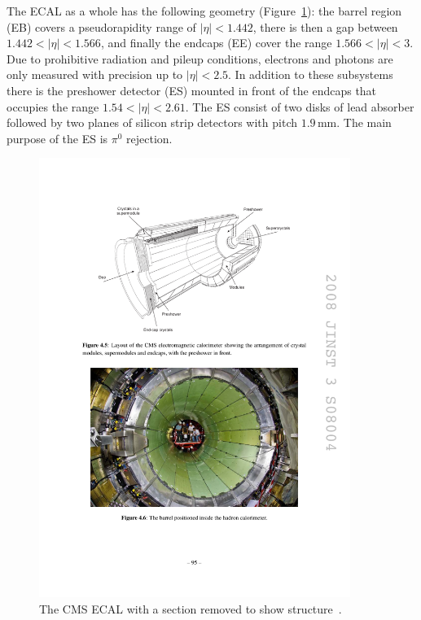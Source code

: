 The ECAL as a whole has the following geometry (Figure~\ref{fig:apparatus:ecal}): the barrel region (EB) covers a pseudorapidity range of $|\eta|<1.442$, there is then a gap between $1.442<|\eta|<1.566$, and finally the endcaps (EE) cover the range $1.566<|\eta|<3$. Due to prohibitive radiation and pileup conditions, electrons and photons are only measured with precision up to $|\eta|<2.5$. 
In addition to these subsystems there is the preshower detector (ES) mounted in front of the endcaps that occupies the range $1.54<|\eta|<2.61$. The ES consist of two disks of lead absorber followed by two planes of silicon strip detectors with pitch $1.9$\,mm. The main purpose of the ES is $\pi^{0}$ rejection. 
\begin{figure}[h!]
    \centering
    \includegraphics[width=0.9\textwidth]{figures/apparatus/ECAL_alt.pdf}
    \caption{The CMS ECAL with a section removed to show structure~\cite{CMSatLHC}.}
    \label{fig:apparatus:ecal}
\end{figure}


